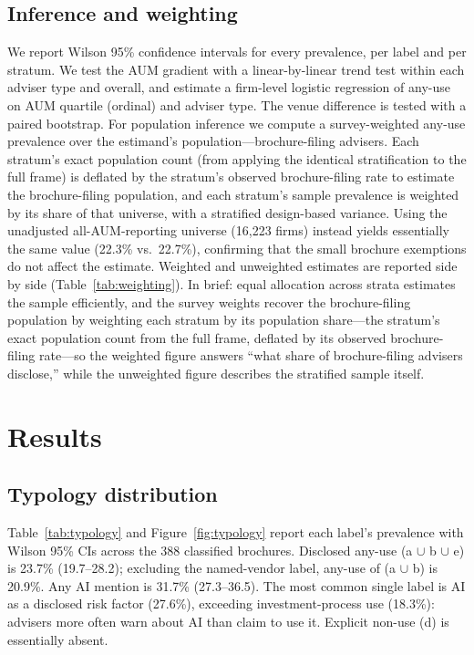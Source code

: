 \documentclass[utf8]{FrontiersinHarvard}
\begin{document}
\subsection{Inference and weighting}
We report Wilson 95\% confidence intervals for every prevalence, per label and per stratum. We test the AUM gradient with a linear-by-linear trend test within each adviser type and overall, and estimate a firm-level logistic regression of any-use on AUM quartile (ordinal) and adviser type. The venue difference is tested with a paired bootstrap. For population inference we compute a survey-weighted any-use prevalence over the estimand's population---brochure-filing advisers. Each stratum's exact population count (from applying the identical stratification to the full frame) is deflated by the stratum's observed brochure-filing rate to estimate the brochure-filing population, and each stratum's sample prevalence is weighted by its share of that universe, with a stratified design-based variance. Using the unadjusted all-AUM-reporting universe (16{,}223 firms) instead yields essentially the same value (22.3\% vs.\ 22.7\%), confirming that the small brochure exemptions do not affect the estimate. Weighted and unweighted estimates are reported side by side (Table~\ref{tab:weighting}). In brief: equal allocation across strata estimates the sample efficiently, and the survey weights recover the brochure-filing population by weighting each stratum by its population share---the stratum's exact population count from the full frame, deflated by its observed brochure-filing rate---so the weighted figure answers ``what share of brochure-filing advisers disclose,'' while the unweighted figure describes the stratified sample itself.

\section{Results}

\subsection{Typology distribution}
Table~\ref{tab:typology} and Figure~\ref{fig:typology} report each label's prevalence with Wilson 95\% CIs across the 388 classified brochures. Disclosed any-use (a $\cup$ b $\cup$ e) is 23.7\% (19.7--28.2); excluding the named-vendor label, any-use of (a $\cup$ b) is 20.9\%. Any AI mention is 31.7\% (27.3--36.5). The most common single label is AI as a disclosed risk factor (27.6\%), exceeding investment-process use (18.3\%): advisers more often warn about AI than claim to use it. Explicit non-use (d) is essentially absent.
\end{document}

